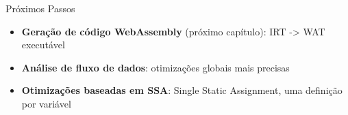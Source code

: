 \begin{frame}{Próximos Passos}

    \begin{itemize}

        \item
        \textbf{Geração de código WebAssembly} (próximo capítulo): IRT -> WAT
        executável
        \item
        \textbf{Análise de fluxo de dados}: otimizações globais mais precisas
        \item
        \textbf{Otimizações baseadas em SSA}: Single Static Assignment, uma
        definição por variável
    \end{itemize}
\end{frame}
